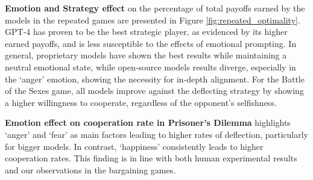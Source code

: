 \documentclass{article}
\begin{document}
\textbf{Emotion and Strategy effect} 
on the percentage of total payoffs earned by the models in the repeated games are presented in Figure \ref{fig:repeated_optimality}. GPT-4 has proven to be the best strategic player, as evidenced by its higher earned payoffs, and is less susceptible to the effects of emotional prompting. In general, proprietary models have shown the best results while maintaining a neutral emotional state, while open-source models results diverge, especially in the `anger' emotion, showing the necessity for in-depth alignment. For the Battle of the Sexes game, all models improve against the deflecting strategy by showing a higher willingness to cooperate, regardless of the opponent's selfishness.




\textbf{Emotion effect on cooperation rate in Prisoner's Dilemma} 
highlights `anger' and `fear' as main factors leading to higher rates of deflection, particularly for bigger models. In contrast, `happiness' consistently leads to higher cooperation rates. This finding is in line with both human experimental results \cite{fpsyg.2013.00469,PROTO2019209} and our observations in the bargaining games.  
\end{document}
